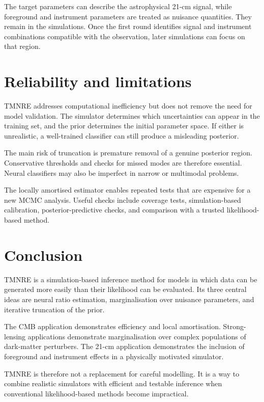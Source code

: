 ﻿\documentclass[13pt,a4paper]{article}
\begin{document}
The target parameters can describe the astrophysical 21-cm signal, while foreground and instrument parameters are treated as nuisance quantities. They remain in the simulations. Once the first round identifies signal and instrument combinations compatible with the observation, later simulations can focus on that region.

\section*{Reliability and limitations}

TMNRE addresses computational inefficiency but does not remove the need for model validation. The simulator determines which uncertainties can appear in the training set, and the prior determines the initial parameter space. If either is unrealistic, a well-trained classifier can still produce a misleading posterior.

The main risk of truncation is premature removal of a genuine posterior region. Conservative thresholds and checks for missed modes are therefore essential. Neural classifiers may also be imperfect in narrow or multimodal problems.

The locally amortised estimator enables repeated tests that are expensive for a new MCMC analysis. Useful checks include coverage tests, simulation-based calibration, posterior-predictive checks, and comparison with a trusted likelihood-based method.

\section*{Conclusion}

TMNRE is a simulation-based inference method for models in which data can be generated more easily than their likelihood can be evaluated. Its three central ideas are neural ratio estimation, marginalisation over nuisance parameters, and iterative truncation of the prior.

The CMB application demonstrates efficiency and local amortisation. Strong-lensing applications demonstrate marginalisation over complex populations of dark-matter perturbers. The 21-cm application demonstrates the inclusion of foreground and instrument effects in a physically motivated simulator.

TMNRE is therefore not a replacement for careful modelling. It is a way to combine realistic simulators with efficient and testable inference when conventional likelihood-based methods become impractical.
\end{document}
